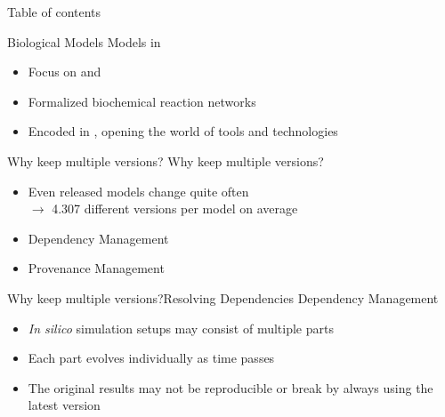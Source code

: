 


\begin{frame}{Table of contents}
	\tableofcontents
\end{frame}
 
\begin{frame}{Biological Models}{}
	{\Large Models in \sysbio}
	\\[2.5em]
	\begin{itemize}
		\item Focus on \sbml \nocite{Hucka2003} and \cellml \nocite{Cuellar2003}
		\item Formalized biochemical reaction networks
		\item Encoded in \xml, opening the world of \xml tools and technologies
		
	\end{itemize}
\end{frame}

\begin{frame}{Why keep multiple versions?}{}
	{\Large Why keep multiple versions?}
	\\[2.5em]
	\begin{itemize}
		\item Even released models change quite often \\
		$\rightarrow $ 4.307 different versions per model on average
		\item Dependency Management %
		\item Provenance Management
	\end{itemize}
\end{frame}

\begin{frame}{Why keep multiple versions?}{Resolving Dependencies}
	{\Large Dependency Management}
	\\[2.5em]
	\begin{itemize}
		\item \emph{In silico} simulation setups may consist of multiple parts \nocite{Waltemath2013}
		\item Each part evolves individually as time passes
		\item The original results may not be reproducible or break by always using the latest version
	\end{itemize}
\end{frame}


